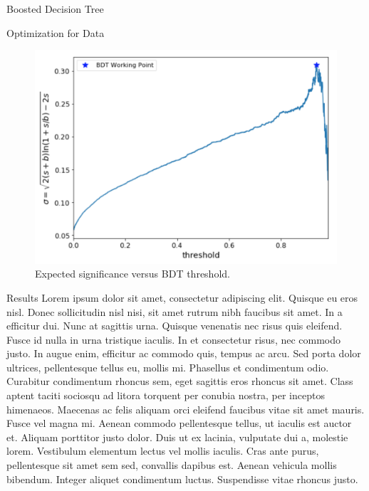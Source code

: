 \begin{section}{Boosted Decision Tree}
\begin{subsection}{Optimization for Data}
\begin{figure}[htb]
\begin{center}
\includegraphics[width=.95\linewidth]{Dissertation/fig/bdt-data-expsig.png}
\end{center}
\caption{Expected significance versus BDT threshold.}
\label{fig:bdt-data-expsig}
\end{figure}

\end{subsection}
\end{section}

\begin{section}{Results}
Lorem ipsum dolor sit amet, consectetur adipiscing elit. Quisque eu eros nisl. Donec sollicitudin nisl nisi, sit amet rutrum nibh faucibus sit amet. In a efficitur dui. Nunc at sagittis urna. Quisque venenatis nec risus quis eleifend. Fusce id nulla in urna tristique iaculis. In et consectetur risus, nec commodo justo. In augue enim, efficitur ac commodo quis, tempus ac arcu. Sed porta dolor ultrices, pellentesque tellus eu, mollis mi. Phasellus et condimentum odio. Curabitur condimentum rhoncus sem, eget sagittis eros rhoncus sit amet. Class aptent taciti sociosqu ad litora torquent per conubia nostra, per inceptos himenaeos. Maecenas ac felis aliquam orci eleifend faucibus vitae sit amet mauris. Fusce vel magna mi. Aenean commodo pellentesque tellus, ut iaculis est auctor et.
Aliquam porttitor justo dolor. Duis ut ex lacinia, vulputate dui a, molestie lorem. Vestibulum elementum lectus vel mollis iaculis. Cras ante purus, pellentesque sit amet sem sed, convallis dapibus est. Aenean vehicula mollis bibendum. Integer aliquet condimentum luctus. Suspendisse vitae rhoncus justo.
\end{section}

